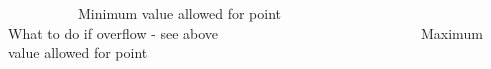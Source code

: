 ~\newline
~\newline
~\newline
~\newline
~\newline
~\newline
 Minimum value allowed for point ~\newline
~\newline
~\newline
~\newline
~\newline
~\newline
~\newline
~\newline
~\newline
~\newline
~\newline
~\newline
~\newline
~\newline
~\newline
~\newline
~\newline
~\newline
 What to do if overflow -\/ see above ~\newline
~\newline
~\newline
~\newline
~\newline
~\newline
~\newline
~\newline
~\newline
~\newline
~\newline
~\newline
~\newline
~\newline
~\newline
~\newline
~\newline
 Maximum value allowed for point ~\newline
~\newline
~\newline
~\newline
~\newline
~\newline
~\newline
~\newline
~\newline
